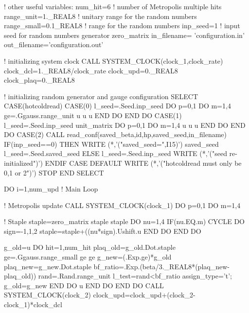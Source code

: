 {! other useful variables:
   num_hit=6                ! number of Metropolis multiple hits
   range_unit=1._REAL8      ! unitary range for the random numbers
   range_small=0.1_REAL8    ! range for the random numbers
   inp_seed=1               ! input seed for random numbers generator
   zero_matrix%
   in_filename= 'configuration.in'    
   out_filename='configuration.out'

! initializing system clock
   CALL SYSTEM_CLOCK(clock_1,clock_rate)
   clock_dcl=1._REAL8/clock_rate
   clock_upd=0._REAL8
   clock_plaq=0._REAL8

! initializing random generator and gauge configuration
   SELECT CASE(hotcoldread)
   CASE(0)
     l_seed=.Seed.inp_seed
     DO p=0,1
     DO m=1,4
       ge=.Ggauss.range_unit
       u%
       u%
       u%
     END DO
     END DO
   CASE(1)
     l_seed=.Seed.inp_seed
     unit_matrix%
     DO p=0,1
     DO m=1,4
       u%
       u%
       u%
     END DO
     END DO
   CASE(2)
     CALL read_conf(saved_beta,id,hp,saved_seed,in_filename)    
     IF(inp_seed==0) THEN
       WRITE (*,'("saved_seed=",I15)') saved_seed
       l_seed=.Seed.saved_seed
     ELSE
       l_seed=.Seed.inp_seed
       WRITE (*,'("seed re-initialized")')
     ENDIF
   CASE DEFAULT
     WRITE (*,'("hotcoldread must only be 0,1 or 2")')
     STOP
   END SELECT

   DO i=1,num_upd                        ! Main Loop

! Metropolis update 
      CALL SYSTEM_CLOCK(clock_1)
      DO p=0,1
      DO m=1,4

        ! Staple
        staple=zero_matrix
        staple%
        staple%
        DO nu=1,4
          IF(nu.EQ.m) CYCLE
          DO sign=-1,1,2
            staple=staple+((nu*sign).Ushift.u%
          END DO
        END DO

        g_old=u%
        DO hit=1,num_hit
          plaq_old=g_old.Dot.staple
          ge=.Ggauss.range_small
          ge%
          ge%
          g_new=(.Exp.ge)*g_old
          plaq_new=g_new.Dot.staple
          bf_ratio=.Exp.(beta/3._REAL8*(plaq_new-plaq_old))
          rand=.Rand.range_unit
          l_test=rand<bf_ratio
          assign_type='t'; g_old=g_new
        END DO
        u%
      END DO
      END DO
      CALL SYSTEM_CLOCK(clock_2)
      clock_upd=clock_upd+(clock_2-clock_1)*clock_dcl

}
